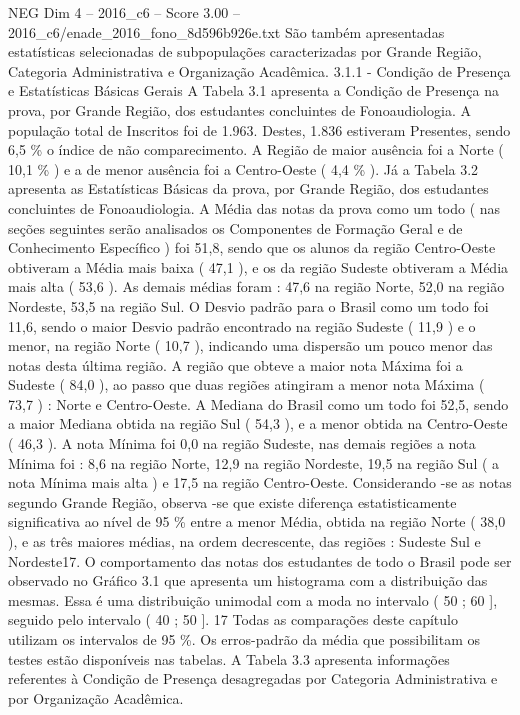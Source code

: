 \begin{textsample}{NEG Dim 4 – 2016\_c6 – Score 3.00 – 2016\_c6/enade\_2016\_fono\_8d596b926e.txt}
São também apresentadas estatísticas selecionadas de subpopulações caracterizadas por Grande Região, Categoria Administrativa e Organização Acadêmica. 3.1.1 - Condição de Presença e Estatísticas Básicas Gerais A Tabela 3.1 apresenta a Condição de Presença na prova, por Grande Região, dos estudantes concluintes de Fonoaudiologia.
A população total de Inscritos foi de 1.963.
Destes, 1.836 estiveram Presentes, sendo 6,5 \% o índice de não comparecimento.
A Região de maior ausência foi a Norte ( 10,1 \% ) e a de menor ausência foi a Centro-Oeste ( 4,4 \% ).
Já a Tabela 3.2 apresenta as Estatísticas Básicas da prova, por Grande Região, dos estudantes concluintes de Fonoaudiologia.
A Média das notas da prova como um todo ( nas seções seguintes serão analisados os Componentes de Formação Geral e de Conhecimento Específico ) foi 51,8, sendo que os alunos da região Centro-Oeste obtiveram a Média mais baixa ( 47,1 ), e os da região Sudeste obtiveram a Média mais alta ( 53,6 ).
As demais médias foram : 47,6 na região Norte, 52,0 na região Nordeste, 53,5 na região Sul.
O Desvio padrão para o Brasil como um todo foi 11,6, sendo o maior Desvio padrão encontrado na região Sudeste ( 11,9 ) e o menor, na região Norte ( 10,7 ), indicando uma dispersão um pouco menor das notas desta última região.
A região que obteve a maior nota Máxima foi a Sudeste ( 84,0 ), ao passo que duas regiões atingiram a menor nota Máxima ( 73,7 ) : Norte e Centro-Oeste.
A Mediana do Brasil como um todo foi 52,5, sendo a maior Mediana obtida na região Sul ( 54,3 ), e a menor obtida na Centro-Oeste ( 46,3 ).
A nota Mínima foi 0,0 na região Sudeste, nas demais regiões a nota Mínima foi : 8,6 na região Norte, 12,9 na região Nordeste, 19,5 na região Sul ( a nota Mínima mais alta ) e 17,5 na região Centro-Oeste.
Considerando -se as notas segundo Grande Região, observa -se que existe diferença estatisticamente significativa ao nível de 95 \% entre a menor Média, obtida na região Norte ( 38,0 ), e as três maiores médias, na ordem decrescente, das regiões : Sudeste Sul e Nordeste17.
O comportamento das notas dos estudantes de todo o Brasil pode ser observado no Gráfico 3.1 que apresenta um histograma com a distribuição das mesmas.
Essa é uma distribuição unimodal com a moda no intervalo ( 50 ; 60 ], seguido pelo intervalo ( 40 ; 50 ]. 17 Todas as comparações deste capítulo utilizam os intervalos de 95 \%.
Os erros-padrão da média que possibilitam os testes estão disponíveis nas tabelas.
A Tabela 3.3 apresenta informações referentes à Condição de Presença desagregadas por Categoria Administrativa e por Organização Acadêmica.

\end{textsample}
